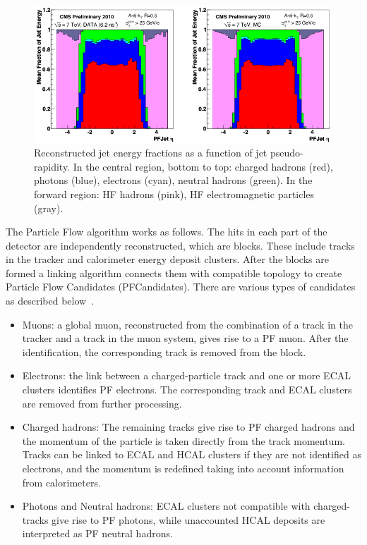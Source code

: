 \begin{figure}
\begin{center}
\includegraphics[width=0.99\textwidth]{Reconstruction/Pandolfi_jetenergy.pdf}
\caption{Reconstructed jet energy fractions as a function of jet pseudo-rapidity. In the central region, bottom to top: charged hadrons (red), photons (blue), electrons (cyan), neutral hadrons (green). In the forward region: HF hadrons (pink), HF electromagnetic particles (gray).~\cite{Pandolfi_thesis}}
\label{fig:jet_energy_components}
\end{center}
\end{figure}

The Particle Flow algorithm works as follows.  The hits in each part of the detector are independently reconstructed, which are blocks.  These include tracks in the tracker and calorimeter energy deposit clusters.  After the blocks are formed a linking algorithm connects them with compatible topology to create Particle Flow Candidates (PFCandidates).  There are various types of candidates as described below~\cite{Cosa_thesis}.

\begin{itemize}
\item
Muons: a global muon, reconstructed from the combination of a track in the tracker and a track in the muon system, gives rise to a PF muon. After the identification, the corresponding track is removed from the block.
\item
 Electrons: the link between a charged-particle track and one or more ECAL clusters identifies PF electrons. The corresponding track and ECAL clusters are removed from further processing.
\item
 Charged hadrons: The remaining tracks give rise to PF charged hadrons and the momentum of the particle is taken directly from the track momentum. Tracks can be linked to ECAL and HCAL clusters if they are not identified as electrons, and the momentum is redefined taking into account information from calorimeters.
\item
Photons and Neutral hadrons: ECAL clusters not compatible with charged-tracks give rise to PF photons, while unaccounted HCAL deposits are interpreted as PF neutral hadrons.
\end{itemize}

